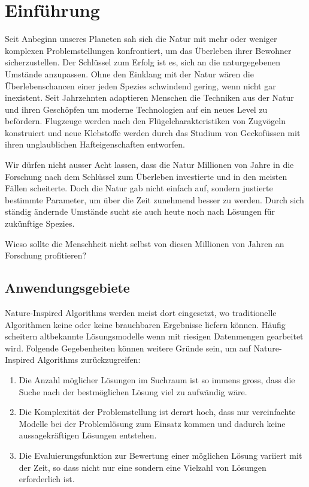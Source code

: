 \chapter{Einführung}

Seit Anbeginn unseres Planeten sah sich die Natur mit mehr oder weniger
komplexen Problemstellungen konfrontiert, um das Überleben ihrer Bewohner
sicherzustellen. Der Schlüssel zum Erfolg ist es, sich an die
naturgegebenen Umstände anzupassen. Ohne den Einklang mit der Natur wären die
Überlebenschancen einer jeden Spezies schwindend gering, wenn nicht gar inexistent.
Seit Jahrzehnten adaptieren Menschen die Techniken aus der Natur und ihren Geschöpfen
um moderne Technologien auf ein neues Level zu befördern. Flugzeuge werden nach den
Flügelcharakteristiken von Zugvögeln konstruiert und neue Klebstoffe werden durch das
Studium von Geckofüssen mit ihren unglaublichen Hafteigenschaften entworfen. \cite{Cro14}

Wir dürfen nicht ausser Acht lassen, dass die Natur Millionen von Jahre in die Forschung
nach dem Schlüssel zum Überleben investierte und in den meisten Fällen scheiterte. Doch
die Natur gab nicht einfach auf, sondern justierte bestimmte Parameter, um über die Zeit
zunehmend besser zu werden. Durch sich ständig ändernde Umstände sucht sie auch heute noch
nach Lösungen für zukünftige Spezies.

Wieso sollte die Menschheit nicht selbst von diesen Millionen von Jahren an Forschung profitieren?

\section{Anwendungsgebiete}

Nature-Inspired Algorithms werden meist dort eingesetzt, wo traditionelle Algorithmen keine oder
keine brauchbaren Ergebnisse liefern können. Häufig scheitern altbekannte Lösungsmodelle wenn mit
riesigen Datenmengen gearbeitet wird. Folgende Gegebenheiten können weitere Gründe sein, um auf
Nature-Inspired Algorithms zurückzugreifen:

\begin{enumerate}
    \item Die Anzahl möglicher Lösungen im Suchraum ist so immens gross, dass die Suche nach der bestmöglichen
          Lösung viel zu aufwändig wäre.
    \item Die Komplexität der Problemstellung ist derart hoch, dass nur vereinfachte Modelle bei der Problemlösung
          zum Einsatz kommen und dadurch keine aussagekräftigen Lösungen entstehen.
    \item Die Evaluierungsfunktion zur Bewertung einer möglichen Lösung variiert mit der Zeit, so dass nicht nur eine
          sondern eine Vielzahl von Lösungen erforderlich ist.
\end{enumerate}

